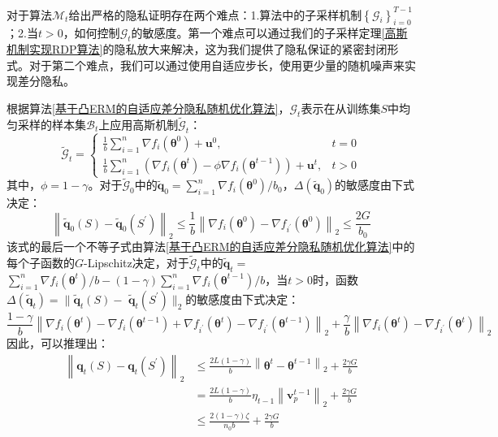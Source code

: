 对于算法$\mathcal{M}_{t}$给出严格的隐私证明存在两个难点：1.算法中的子采样机制$\left\{\mathcal{G}_{i}\right\}_{i=0}^{T-1}$；2.当$t>0$，如何控制$\mathcal{G}_{t}$的敏感度。第一个难点可以通过我们的子采样定理\ref{高斯机制实现RDP算法}的隐私放大来解决，这为我们提供了隐私保证的紧密封闭形式。对于第二个难点，我们可以通过使用自适应步长，使用更少量的随机噪声来实现差分隐私。

根据算法\ref{基于凸ERM的自适应差分隐私随机优化算法}，$\mathcal{G}_{t}$表示在从训练集$S$中均匀采样的样本集$\mathcal{B}_{t}$上应用高斯机制$\widetilde{\mathcal{G}}_{t}$：
$$
\widetilde{\mathcal{G}}_{t}=\left\{\begin{array}{ll}
\frac{1}{b} \sum_{i=1}^{n} \nabla f_{i}\left(\boldsymbol{\theta}^{0}\right)+\mathbf{u}^{0}, & t=0 \\
\frac{1}{b} \sum_{i=1}^{n}\left(\nabla f_{i}\left(\boldsymbol{\theta}^{t}\right)-\phi \nabla f_{i}\left(\boldsymbol{\theta}^{t-1}\right)\right)+\mathbf{u}^{t}, & t>0
\end{array}\right.
$$
其中，$\phi=1-\gamma$。对于$\widetilde{\mathcal{G}}_{0}$中的$\widetilde{\mathbf{q}}_{0}=\sum_{i=1}^{n} \nabla f_{i}\left(\boldsymbol{\theta}^{0}\right) / b_{0}$，$\Delta\left(\widetilde{\mathbf{q}}_{0}\right)$的敏感度由下式决定：
$$
\left\|\widetilde{\mathbf{q}}_{0}(S)-\widetilde{\mathbf{q}}_{0}\left(S^{\prime}\right)\right\|_{2} \leq \frac{1}{b}\left\|\nabla f_{i}\left(\boldsymbol{\theta}^{0}\right)-\nabla f_{i^{\prime}}\left(\boldsymbol{\theta}^{0}\right)\right\|_{2} \leq \frac{2 G}{b_{0}}
$$
该式的最后一个不等子式由算法\ref{基于凸ERM的自适应差分隐私随机优化算法}中的每个子函数的$G$-Lipschitz决定，对于$\widetilde{\mathcal{G}}_{t}$中的$\widetilde{\mathbf{q}}_{t}=$ $\sum_{i=1}^{n} \nabla f_{i}\left(\boldsymbol{\theta}^{t}\right) / b-(1-\gamma) \sum_{i=1}^{n} \nabla f_{i}\left(\boldsymbol{\theta}^{t-1}\right) / b$，当$t>0$时，函数$\Delta\left(\widetilde{\mathbf{q}}_{t}\right)=\| \widetilde{\mathbf{q}}_{t}(S)-$ $\widetilde{\mathbf{q}}_{t}\left(S^{\prime}\right) \|_{2}$的敏感度由下式决定：
$$
\frac{1-\gamma}{b}\left\|\nabla f_{i}\left(\boldsymbol{\theta}^{t}\right)-\nabla f_{i}\left(\boldsymbol{\theta}^{t-1}\right)+\nabla f_{i^{\prime}}\left(\boldsymbol{\theta}^{t}\right)-\nabla f_{i^{\prime}}\left(\boldsymbol{\theta}^{t-1}\right)\right\|_{2}+\frac{\gamma}{b}\left\|\nabla f_{i}\left(\boldsymbol{\theta}^{t}\right)-\nabla f_{i^{\prime}}\left(\boldsymbol{\theta}^{t}\right)\right\|_{2}
$$
因此，可以推理出：
$$
\begin{aligned}
\left\|\mathbf{q}_{t}(S)-\mathbf{q}_{t}\left(S^{\prime}\right)\right\|_{2} & \leq \frac{2 L(1-\gamma)}{b}\left\|\boldsymbol{\theta}^{t}-\boldsymbol{\theta}^{t-1}\right\|_{2}+\frac{2 \gamma G}{b} \\
&=\frac{2 L(1-\gamma)}{b} \eta_{t-1}\left\|\mathbf{v}_{p}^{t-1}\right\|_{2}+\frac{2 \gamma G}{b} \\
& \leq \frac{2(1-\gamma) \zeta}{n_{0} b}+\frac{2 \gamma G}{b}
\end{aligned}
$$


